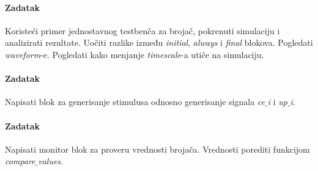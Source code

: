 \paragraph{Zadatak}

Koristeći primer jednostavnog testbenča za brojač, pokrenuti simulaciju i
analizirati rezultate.
Uočiti razlike između \emph{initial}, \emph{always} i \emph{final} blokova.
Pogledati \emph{waveform}-e.
Pogledati kako menjanje \emph{timescale}-a utiče na simulaciju.

\paragraph{Zadatak}

Napisati blok za generisanje stimulusa odnosno generisanje signala
\emph{ce\(\_\)i} i \emph{up\(\_\)i}.

\paragraph{Zadatak}

Napisati monitor blok za proveru vrednosti brojača.
Vrednosti porediti funkcijom \emph{compare\(\_\)values}.


